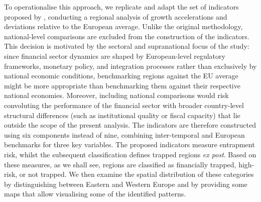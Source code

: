 \documentclass[a4paper,11pt,oneside]{article}
\begin{document}
To operationalise this approach, we replicate and adapt the set of indicators proposed by \cite{diemer2022regional}, conducting a regional analysis of growth accelerations and deviations relative to the European average. Unlike the original methodology, national-level comparisons are excluded from the construction of the indicators. This decision is motivated by the sectoral and supranational focus of the study: since financial sector dynamics are shaped by European-level regulatory frameworks, monetary policy, and integration processes rather than exclusively by national economic conditions, benchmarking regions against the EU average might be more appropriate than benchmarking them against their respective national economies. Moreover, including national comparisons would risk convoluting the performance of the financial sector with broader country-level structural differences (such as institutional quality or fiscal capacity) that lie outside the scope of the present analysis. The indicators are therefore constructed using six components instead of nine, combining inter-temporal and European benchmarks for three key variables. The proposed indicators measure entrapment risk, whilst the subsequent classification defines trapped regions \textit{ex post}. Based on these measures, as we shall see, regions are classified as financially trapped, high-risk, or not trapped. We then examine the spatial distribution of these categories by distinguishing between Eastern and Western Europe and by providing some maps that allow visualising some of the identified patterns.



\end{document}
